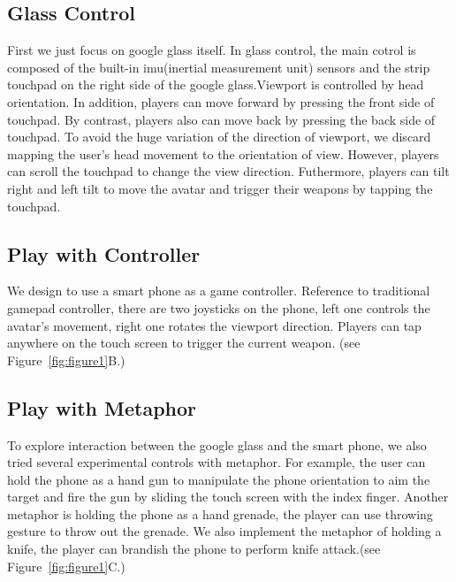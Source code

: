 \documentclass{sigchi}
\begin{document}
\subsection{Glass Control}
First we just focus on google glass itself. In glass control, the main cotrol is composed of the built-in imu(inertial measurement unit) sensors and the strip touchpad on the right side of the google glass.Viewport is controlled by head orientation. In addition, players can move forward by pressing the front side of touchpad. By contrast, players also can move back by pressing the back side of touchpad.
To avoid the huge variation of the direction of viewport, we discard mapping the user's head movement to the orientation of view. However, players can scroll the touchpad to change the view direction. Futhermore, players can tilt right and left tilt to move the avatar and trigger their weapons by tapping the touchpad.%

\subsection{Play with Controller}
We design to use a smart phone as a game controller. Reference to traditional gamepad controller, there are two joysticks on the phone, left one controls the avatar's movement, right one rotates the viewport direction. Players can tap anywhere on the touch screen to trigger the current weapon. %
(see Figure~\ref{fig:figure1}B.)

\subsection{Play with Metaphor}
To explore interaction between the google glass and the smart phone, we also tried several experimental controls with metaphor. For example, the user can hold the phone as a hand gun to manipulate the phone orientation to aim the target and fire the gun by sliding the touch screen with the index finger. Another metaphor is holding the phone as a hand grenade, the player can use throwing gesture to throw out the grenade. We also implement the metaphor of holding a knife, the player can brandish the phone to perform knife attack.(see Figure~\ref{fig:figure1}C.)
\end{document}
